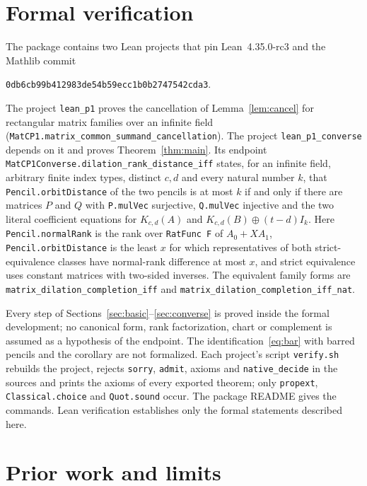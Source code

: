 \documentclass[11pt]{article}
\newcommand{\code}[1]{\nolinkurl{#1}}
\begin{document}
\section{Formal verification}\label{sec:lean}

The package contains two Lean projects that pin Lean~4.35.0-rc3 and the Mathlib commit
\begin{center}\code{0db6cb99b412983de54b59ecc1b0b2747542cda3}.\end{center}
 The project \code{lean_p1} proves the cancellation of Lemma~\ref{lem:cancel} for rectangular matrix families over an infinite field (\code{MatCP1.matrix_common_summand_cancellation}). The project \code{lean_p1_converse} depends on it and proves Theorem~\ref{thm:main}. Its endpoint \code{MatCP1Converse.dilation_rank_distance_iff} states, for an infinite field, arbitrary finite index types, distinct $c,d$ and every natural number $k$, that \code{Pencil.orbitDistance} of the two pencils is at most $k$ if and only if there are matrices $P$ and $Q$ with \code{P.mulVec} surjective, \code{Q.mulVec} injective and the two literal coefficient equations for $K_{c,d}(A)$ and $K_{c,d}(B)\oplus(t-d)I_k$. Here \code{Pencil.normalRank} is the rank over \code{RatFunc F} of $A_0+XA_1$, \code{Pencil.orbitDistance} is the least $x$ for which representatives of both strict-equivalence classes have normal-rank difference at most $x$, and strict equivalence uses constant matrices with two-sided inverses. The equivalent family forms are \code{matrix_dilation_completion_iff} and \code{matrix_dilation_completion_iff_nat}.

Every step of Sections~\ref{sec:basic}--\ref{sec:converse} is proved inside the formal development; no canonical form, rank factorization, chart or complement is assumed as a hypothesis of the endpoint. The identification~\eqref{eq:bar} with barred pencils and the corollary are not formalized. Each project's script \code{verify.sh} rebuilds the project, rejects \code{sorry}, \code{admit}, axioms and \code{native_decide} in the sources and prints the axioms of every exported theorem; only \code{propext}, \code{Classical.choice} and \code{Quot.sound} occur. The package README gives the commands. Lean verification establishes only the formal statements described here.

\section{Prior work and limits}\label{sec:novelty}
\end{document}
